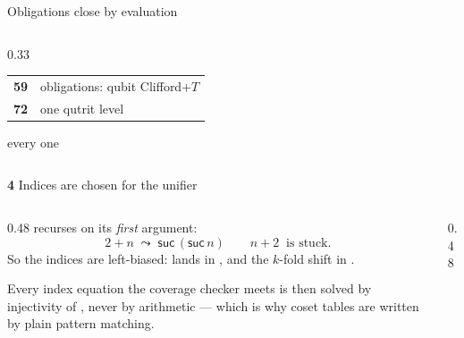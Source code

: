 \begin{frame}{Obligations close by evaluation}
\begin{columns}[c]
\begin{column}{0.33\textwidth}
\vspace{8pt}
\begin{tabular}{@{}rl@{}}
\textbf{59} & obligations: qubit Clifford+$T$\\
\textbf{72} & one qutrit level\\
\end{tabular}

{\small every one }
\end{column}
\end{columns}
\end{frame}

\begin{frame}{\textbf{4}\; Indices are chosen for the unifier}
\begin{columns}[c]
\begin{column}{0.48\textwidth}
\aid{\_+\_} recurses on its \emph{first} argument:
\[ 2 + n \;\leadsto\; \mathsf{suc}\,(\mathsf{suc}\,n) \qquad n + 2 \;\;\text{is stuck.} \]
So the indices are \alert{left-biased}:  lands in
, and the $k$-fold shift in .
\vspace{6pt}

Every index equation the coverage checker meets is then solved by
\alert{injectivity of }, never by arithmetic --- which is why coset
tables are written by plain pattern matching.
\end{column}
\begin{column}{0.48\textwidth}
\centering
{}
\end{column}
\end{columns}
\end{frame}
